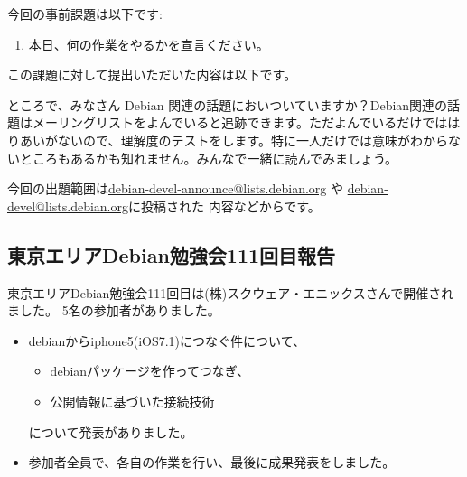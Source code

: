 \documentclass[mingoth,a4paper]{jsarticle}
\begin{document}

今回の事前課題は以下です:
\begin{enumerate}
 \item 本日、何の作業をやるかを宣言ください。
\end{enumerate}
この課題に対して提出いただいた内容は以下です。
\begin{multicols}{2}
{\small

}
\end{multicols}


ところで、みなさん Debian 関連の話題においついていますか？Debian関連の話
題はメーリングリストをよんでいると追跡できます。ただよんでいるだけではは
りあいがないので、理解度のテストをします。特に一人だけでは意味がわからな
いところもあるかも知れません。みんなで一緒に読んでみましょう。

今回の出題範囲は\url{debian-devel-announce@lists.debian.org} や \url{debian-devel@lists.debian.org}に投稿された
内容などからです。

\begin{multicols}{2}

\end{multicols}


\subsection{東京エリアDebian勉強会111回目報告}

 東京エリアDebian勉強会111回目は(株)スクウェア・エニックスさんで開催されました。
5名の参加者がありました。

\begin{itemize}
\item debianからiphone5(iOS7.1)につなぐ件について、
  \begin{itemize}
    \item debianパッケージを作ってつなぎ、
    \item 公開情報に基づいた接続技術
　\end{itemize}
について発表がありました。
\item 参加者全員で、各自の作業を行い、最後に成果発表をしました。
\end{itemize}


\end{document}
